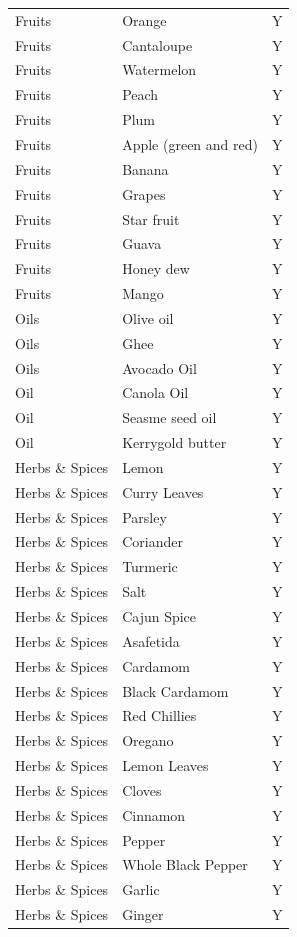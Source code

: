 \documentclass[
  oneside]{book}
\begin{document}
\begin{longtable}[t]{lll}
Fruits & Orange & Y\\
Fruits & Cantaloupe & Y\\
Fruits & Watermelon & Y\\
\addlinespace
Fruits & Peach & Y\\
Fruits & Plum & Y\\
Fruits & Apple (green and red) & Y\\
Fruits & Banana & Y\\
Fruits & Grapes & Y\\
\addlinespace
Fruits & Star fruit & Y\\
Fruits & Guava & Y\\
Fruits & Honey dew & Y\\
Fruits & Mango & Y\\
Oils & Olive oil & Y\\
\addlinespace
Oils & Ghee & Y\\
Oils & Avocado Oil & Y\\
Oil & Canola Oil & Y\\
Oil & Seasme seed oil & Y\\
Oil & Kerrygold butter & Y\\
\addlinespace
Herbs \& Spices & Lemon & Y\\
Herbs \& Spices & Curry Leaves & Y\\
Herbs \& Spices & Parsley & Y\\
Herbs \& Spices & Coriander & Y\\
Herbs \& Spices & Turmeric & Y\\
\addlinespace
Herbs \& Spices & Salt & Y\\
Herbs \& Spices & Cajun Spice & Y\\
Herbs \& Spices & Asafetida & Y\\
Herbs \& Spices & Cardamom & Y\\
Herbs \& Spices & Black Cardamom & Y\\
\addlinespace
Herbs \& Spices & Red Chillies & Y\\
Herbs \& Spices & Oregano & Y\\
Herbs \& Spices & Lemon Leaves & Y\\
Herbs \& Spices & Cloves & Y\\
Herbs \& Spices & Cinnamon & Y\\
\addlinespace
Herbs \& Spices & Pepper & Y\\
Herbs \& Spices & Whole Black Pepper & Y\\
Herbs \& Spices & Garlic & Y\\
Herbs \& Spices & Ginger & Y\\

\end{longtable}
\end{document}
